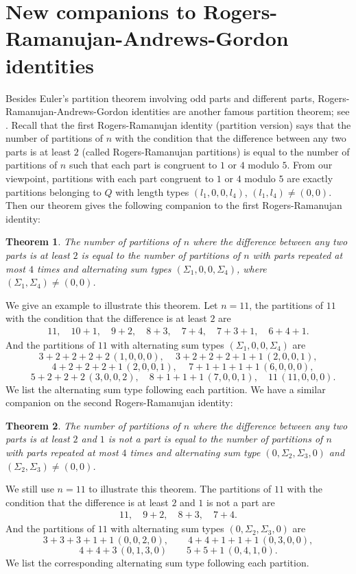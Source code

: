 \documentclass{amsart}
\newtheorem{theorem}{Theorem}
\begin{document}
\section{New companions to Rogers-Ramanujan-Andrews-Gordon identities}

Besides Euler's partition theorem involving odd parts and different parts, Rogers-Ramanujan-Andrews-Gordon identities are another famous partition theorem; see \cite{AlladiBerkovich2, AndrewsRR, Ber-peter, Bressoud}. Recall that the first Rogers-Ramanujan identity (partition version) says that the number of partitions of $n$ with the condition that the difference between any two parts is at least $2$ (called Rogers-Ramanujan partitions) is equal to the number of partitions of $n$ such that each part is congruent to $1$ or $4$ modulo $5$. From our viewpoint, partitions with each part congruent to $1$ or $4$ modulo $5$ are exactly partitions belonging to $Q$ with length types $(l_{1},0, 0, l_{4})$, $(l_{1},l_{4})\neq (0,0)$. Then our theorem gives the following companion to the first Rogers-Ramanujan identity:
\begin{theorem}
The number of partitions of $n$ where the difference between any two parts is at least
$2$ is equal to the number of partitions of $n$ with parts repeated  at most $4$ times and alternating sum types $(\Sigma_{1},0,0,\Sigma_{4})$,  where $(\Sigma_{1}, \Sigma_{4})\neq (0,0)$.
\end{theorem}
We give an example to illustrate this theorem. Let $n=11$, the partitions of $11$ with the condition that the difference is at least
$2$ are
\begin{align*}
11,\quad 10+1,\quad 9+2,\quad 8+3, \quad
7+4, \quad 7+3+1,\quad 6+4+1.
\end{align*}
And the partitions of $11$ with alternating sum types $(\Sigma_{1},0,0,\Sigma_{4})$ are 
$$3+2+2+2+2\,(1,0,0,0),\quad \,3+2+2+2+1+1\,(2,0,0,1),$$
$$\quad 4+2+2+2+1\,(2,0,0,1), \quad\,7+1+1+1+1\,(6,0,0,0),$$ 
$$\quad    5+2+2+2\,(3,0,0,2),\quad 8+1+1+1\,(7,0,0,1),  \quad 11\,(11,0,0,0).$$
We list the alternating sum type following each partition.
We have a similar companion on the second Rogers-Ramanujan identity:
\begin{theorem}
The number of partitions of $n$ where the difference between any two parts is at least
$2$ and $1$ is not a part is equal to the number of partitions of $n$ with parts repeated at most $4$ times and alternating sum type $(0,\Sigma_{2},\Sigma_{3},0)$ and $(\Sigma_{2}, \Sigma_{3})\neq (0,0)$.
\end{theorem}
We still use $n=11$ to illustrate this theorem.  The partitions of $11$ with the condition that the difference is at least
$2$ and $1$ is not a part are
\begin{align*}
11,\quad 9+2,\quad 8+3,\quad
7+4.
\end{align*}
And the partitions of $11$ with alternating sum types $(0,\Sigma_{2},\Sigma_{3},0)$ are 
$$3+3+3+1+1\,(0,0,2,0),\quad\quad 4+4+1+1+1\,(0,3,0,0),$$
$$ 4+4+3\,(0,1,3,0)\quad\quad 5+5+1\,(0,4,1,0).$$
We list the corresponding alternating sum type following each partition.
\end{document}
